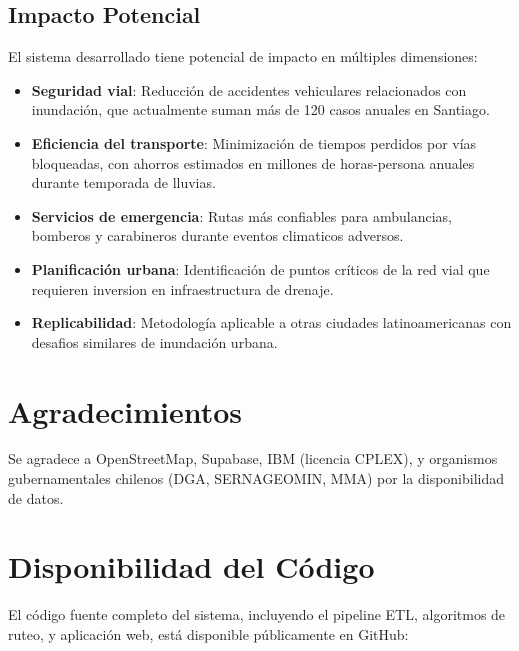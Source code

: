 \documentclass[conference]{IEEEtran}
\begin{document}
\subsection{Impacto Potencial}

El sistema desarrollado tiene potencial de impacto en múltiples dimensiones:

\begin{itemize}
    \item \textbf{Seguridad vial}: Reducción de accidentes vehiculares relacionados con inundación, que actualmente suman más de 120 casos anuales en Santiago.

    \item \textbf{Eficiencia del transporte}: Minimización de tiempos perdidos por vías bloqueadas, con ahorros estimados en millones de horas-persona anuales durante temporada de lluvias.

    \item \textbf{Servicios de emergencia}: Rutas más confiables para ambulancias, bomberos y carabineros durante eventos climaticos adversos.

    \item \textbf{Planificación urbana}: Identificación de puntos críticos de la red vial que requieren inversion en infraestructura de drenaje.

    \item \textbf{Replicabilidad}: Metodología aplicable a otras ciudades latinoamericanas con desafios similares de inundación urbana.
\end{itemize}

\section*{Agradecimientos}

Se agradece a OpenStreetMap, Supabase, IBM (licencia CPLEX), y organismos gubernamentales chilenos (DGA, SERNAGEOMIN, MMA) por la disponibilidad de datos.

\section*{Disponibilidad del Código}

El código fuente completo del sistema, incluyendo el pipeline ETL, algoritmos de ruteo, y aplicación web, está disponible públicamente en GitHub:
\end{document}
